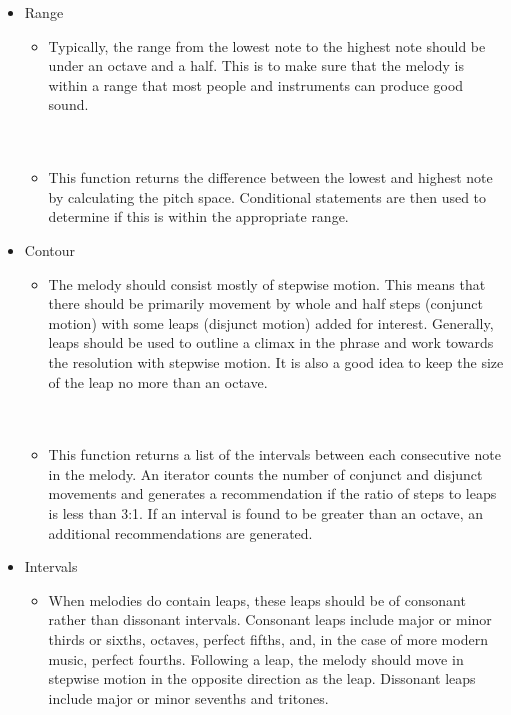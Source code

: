 \begin{itemize}
	\item Range
	\begin{itemize}
		\item Typically, the range from the lowest note to the highest note should be under an octave and a half.  This is to make sure that the melody is within a range that most people and instruments can produce good sound. \\ \\
		 \\
		\item This function returns the difference between the lowest and highest note by calculating the pitch space.  Conditional statements are then used to determine if this is within the appropriate range.
	\end{itemize}
	\item Contour
	\begin{itemize}
		\item The melody should consist mostly of stepwise motion.  This means that there should be primarily movement by whole and half steps (conjunct motion) with some leaps (disjunct motion) added for interest.  Generally, leaps should be used to outline a climax in the phrase and work towards the resolution with stepwise motion.  It is also a good idea to keep the size of the leap no more than an octave. \\ \\
		 \\
		\item This function returns a list of the intervals between each consecutive note in the melody.  An iterator counts the number of conjunct and disjunct movements and generates a recommendation if the ratio of steps to leaps is less than 3:1.  If an interval is found to be greater than an octave, an additional recommendations are generated.
	\end{itemize}
	\item Intervals
	\begin{itemize}
		\item When melodies do contain leaps, these leaps should be of consonant rather than dissonant intervals.  Consonant leaps include major or minor thirds or sixths, octaves, perfect fifths, and, in the case of more modern music, perfect fourths.  Following a leap, the melody should move in stepwise motion in the opposite direction as the leap.  Dissonant leaps include major or minor sevenths and tritones. \\ \\

\end{itemize}
\end{itemize}
